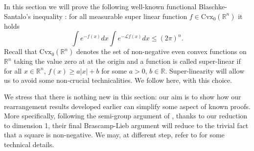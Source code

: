 \documentclass[11pt]{article}
\newtheorem{lemma}[conjecture]{Lemma}
\newcommand{\1}{[1]}
\begin{document}
In this section we will prove the following well-known functional Blaschke-Santalo's inequality \cite{ball86}: for all measurable super linear function $f \in \mathrm{Cvx}_0(\mathbb{R}^n)$ 
it holds
\begin{equation} \label{eq:functionalBS}
    \int e^{-f(x)}dx \int e^{- \mathcal{L}f(x)}dx \leq (2\pi)^n .
\end{equation}
Recall that $\mathrm{Cvx}_0(\mathbb{R}^{n})$ denotes the set of non-negative even convex functions on $\mathbb{R}^{n}$ taking the value zero at at the origin and a function is called super-linear if for all $x \in \mathbb{R}^n$, $f(x) \geq a|x|+b$ for some $a>0$, $b \in \mathbb{R}$. Super-linearity  will allow us to avoid some non-crucial  technicalities. We follow \cite{cordero} here, with this choice.

We stress that there is nothing  new in this section: our aim is to show how our rearrangement results developed earlier can simplify some aspect of known proofs. More specifically, following the semi-group argument of 
\cite{cordero}, thanks to our reduction to dimension 1, their final Brascamp-Lieb argument will reduce to the trivial fact that a square is non-negative. We may, at different step, refer to \cite{artstein-klartag-milman,cordero} for some technical details.



\end{document}
